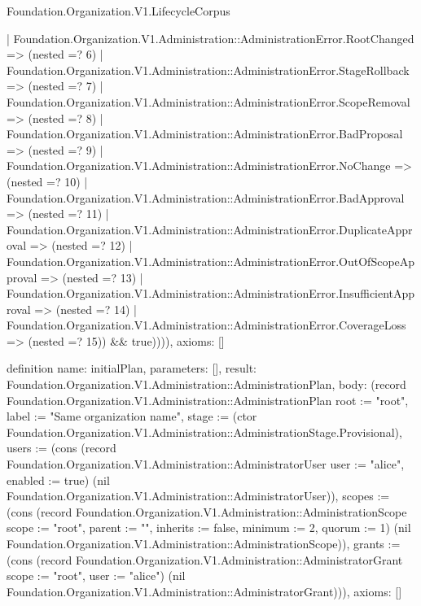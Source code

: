 \begin{lexlean}{Foundation.Organization.V1.LifecycleCorpus}
\begin{semanticmodule}
{        | Foundation.Organization.V1.Administration::AdministrationError.RootChanged => (nested =? 6)
        | Foundation.Organization.V1.Administration::AdministrationError.StageRollback => (nested =? 7)
        | Foundation.Organization.V1.Administration::AdministrationError.ScopeRemoval => (nested =? 8)
        | Foundation.Organization.V1.Administration::AdministrationError.BadProposal => (nested =? 9)
        | Foundation.Organization.V1.Administration::AdministrationError.NoChange => (nested =? 10)
        | Foundation.Organization.V1.Administration::AdministrationError.BadApproval => (nested =? 11)
        | Foundation.Organization.V1.Administration::AdministrationError.DuplicateApproval => (nested =? 12)
        | Foundation.Organization.V1.Administration::AdministrationError.OutOfScopeApproval => (nested =? 13)
        | Foundation.Organization.V1.Administration::AdministrationError.InsufficientApproval => (nested =? 14)
        | Foundation.Organization.V1.Administration::AdministrationError.CoverageLoss => (nested =? 15)) && true)))),
  axioms: []
}

definition{
  name: initialPlan,
  parameters: [],
  result: Foundation.Organization.V1.Administration::AdministrationPlan,
  body: (record Foundation.Organization.V1.Administration::AdministrationPlan {root := "root", label := "Same organization name", stage := (ctor Foundation.Organization.V1.Administration::AdministrationStage.Provisional), users := (cons (record Foundation.Organization.V1.Administration::AdministratorUser {user := "alice", enabled := true}) (nil Foundation.Organization.V1.Administration::AdministratorUser)), scopes := (cons (record Foundation.Organization.V1.Administration::AdministrationScope {scope := "root", parent := "", inherits := false, minimum := 2, quorum := 1}) (nil Foundation.Organization.V1.Administration::AdministrationScope)), grants := (cons (record Foundation.Organization.V1.Administration::AdministratorGrant {scope := "root", user := "alice"}) (nil Foundation.Organization.V1.Administration::AdministratorGrant))}),
  axioms: []
}


\end{semanticmodule}
\end{lexlean}
